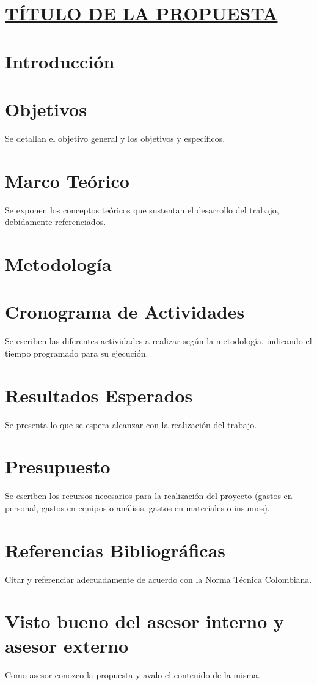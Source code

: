\documentclass{formatoUdeA}
\begin{document}
\section*{\ul{TÍTULO DE LA PROPUESTA}}

\section*{Introducción}


\section*{Objetivos}
Se detallan el objetivo general y los objetivos y específicos.

\section*{Marco Teórico}
Se exponen los conceptos teóricos que sustentan el desarrollo del trabajo, debidamente  referenciados. 

\section*{Metodología}
  

\section*{Cronograma de Actividades}
Se escriben las diferentes actividades a realizar  según la metodología, indicando el tiempo programado para su ejecución. 

\section*{Resultados Esperados}
Se presenta lo que se espera alcanzar con la realización del trabajo. 

\section*{Presupuesto}
Se escriben los recursos necesarios para la realización del proyecto (gastos en personal, gastos en equipos o análisis, gastos en materiales o insumos).

\section*{Referencias Bibliográficas}
Citar y referenciar adecuadamente de acuerdo con la Norma Técnica Colombiana. 

\section*{Visto bueno del asesor interno y asesor externo}
Como asesor conozco la propuesta y avalo el contenido de la misma.


\signature{interno}

\signature{externo}
\end{document}
